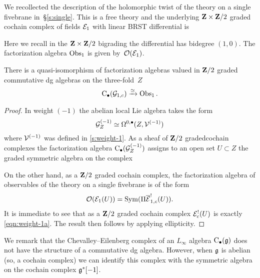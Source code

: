 We recollected the description of the holomorphic twist of the theory on a single fivebrane in~\S\ref{s:single}. 
This is a free theory and the underlying $\mathbf{Z} \times \mathbf{Z}/2$ graded cochain complex of fields $\mathcal E_{1}$ with linear BRST differential is
\beqn
{} 
\eeqn
Here we recall in the $\mathbf{Z} \times \mathbf{Z}/2$ bigrading the differential has bidegree $(1,0)$. 
The factorization algebra $\operatorname{Obs}_1$ is given by~$\mathcal O(\mathcal E_1)$.

\begin{prop}
\label{prop:factabelian}
There is a quasi-isomorphism of factorization algebras valued in $\mathbf{Z}/2$ graded commutative dg algebras on the three-fold~$Z$
\[
{\rm C}_\bullet(\mathcal G_{1,c}) \xrightarrow{\simeq} \operatorname{Obs}_{1} .
\]
\end{prop}

\begin{proof}
In weight $(-1)$ the abelian local Lie algebra takes the form
\[
\mathcal G_Z^{(-1)} \simeq \Omega^{0,\bullet}(Z,\mathcal V^{(-1)}) 
\]
where $\mathcal V^{(-1)}$ was defined in \ref{s:weight-1}.
As a sheaf of $\mathbf{Z}/2$ gradedcochain complexes the factorization algebra ${\rm C}_\bullet(\mathcal G_Z^{(-1)})$ assigns to an open set $U\subset Z$ the graded symmetric algebra on the complex
\beqn\label{eqn:weight-1a}
\eeqn
On the other hand, as a $\mathbf{Z}/2$ graded cochain complex, the factorization algebra of observables of the theory on a single fivebrane is of the form 
\[
\mathcal O(\mathcal E_{1}(U)) = \operatorname{Sym}(\Pi \overline{\mathcal E}_{1,c}^!(U)) .
\]
It is immediate to see that as a $\mathbf{Z}/2$ graded cochain complex $\mathcal E_c^!(U)$ is exactly \eqref{eqn:weight-1a}.
The result then follows by applying ellipticity.
\end{proof}

We remark that the Chevalley--Eilenberg complex of an $L_\infty$ algebra ${\rm C}_\bullet(\mathfrak{g})$ does not have the structure of a commutative dg algebra.
However, when $\mathfrak{g}$ is abelian (so, a cochain complex) we can identify this complex with the symmetric algebra on the cochain complex $\mathfrak g^*[-1]$.

